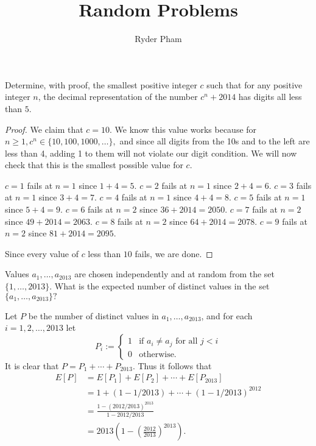 \documentclass[letterpaper,oneside]{scrartcl}
\begin{document}
\title{Random Problems}
\author{Ryder Pham}
\maketitle

\begin{problem*}
    Determine, with proof, the smallest positive integer $c$ such that for any positive integer $n$, the decimal representation of the number $c^n + 2014$ has digits all less than $5$.
\end{problem*}
\begin{proof}
  We claim that $c=10.$ We know this value works because for $n\geq 1, c^n \in \{10,100,1000,\dots\},$ and since all digits from the 10s and to the left are less than 4, adding 1 to them will not violate our digit condition. We will now check that this is the smallest possible value for $c.$ 
  \begin{itemize}
    \ii $c=1$ fails at $n=1$ since $1+4=5.$
    \ii $c=2$ fails at $n=1$ since $2+4=6.$
    \ii $c=3$ fails at $n=1$ since $3+4=7.$
    \ii $c=4$ fails at $n=1$ since $4+4=8.$
    \ii $c=5$ fails at $n=1$ since $5+4=9.$
    \ii $c=6$ fails at $n=2$ since $36+2014=2050.$
    \ii $c=7$ fails at $n=2$ since $49+2014=2063.$
    \ii $c=8$ fails at $n=2$ since $64+2014=2078.$
    \ii $c=9$ fails at $n=2$ since $81+2014=2095.$
  \end{itemize}
  Since every value of $c$ less than $10$ fails, we are done. 
\end{proof}
\begin{problem*}
  Values $a_1,\dots,a_{2013}$ are chosen independently and at random from the set $\{1,\dots,2013\}.$ What is the expected number of distinct values in the set $\{a_1,\dots,a_{2013}\}?$
\end{problem*}
\begin{soln}
  Let $P$ be the number of distinct values in ${a_1,\dots,a_{2013}}$, and for each $i=1,2,\dots,2013$ let
  $$
  P_i :=
  \begin{cases}
    1 & \text{if } a_i \neq a_j \text{ for all } j < i\\
    0 & \text{otherwise.}
  \end{cases}
  $$
  It is clear that $P = P_1+\cdots+P_{2013}.$ Thus it follows that 
  \begin{align*}
    E[P]&=E[P_1]+E[P_2]+\cdots+E[P_{2013}] \\
    &= 1+(1-1/2013)+\cdots+(1-1/2013)^{2012}\\
    &= \frac{1-(2012/2013)^{2013}}{1-2012/2013}\\
    &= 2013\left(1-\left(\frac{2012}{2013}\right)^{2013}\right).
  \end{align*}
\end{soln}
\end{document}
